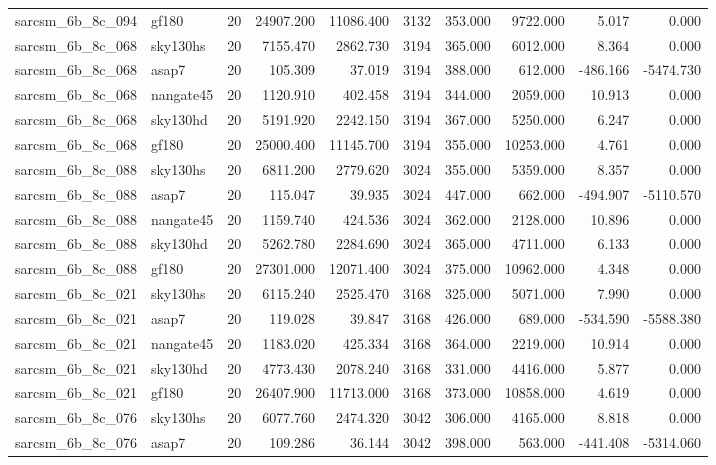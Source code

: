 \documentclass{article}
\begin{document}
\begin{longtable}{llrrrrrrrr}
sarcsm\_6b\_8c\_094 & gf180 & 20 & 24907.200 & 11086.400 & 3132 & 353.000 & 9722.000 & 5.017 & 0.000 \\
sarcsm\_6b\_8c\_068 & sky130hs & 20 & 7155.470 & 2862.730 & 3194 & 365.000 & 6012.000 & 8.364 & 0.000 \\
sarcsm\_6b\_8c\_068 & asap7 & 20 & 105.309 & 37.019 & 3194 & 388.000 & 612.000 & -486.166 & -5474.730 \\
sarcsm\_6b\_8c\_068 & nangate45 & 20 & 1120.910 & 402.458 & 3194 & 344.000 & 2059.000 & 10.913 & 0.000 \\
sarcsm\_6b\_8c\_068 & sky130hd & 20 & 5191.920 & 2242.150 & 3194 & 367.000 & 5250.000 & 6.247 & 0.000 \\
sarcsm\_6b\_8c\_068 & gf180 & 20 & 25000.400 & 11145.700 & 3194 & 355.000 & 10253.000 & 4.761 & 0.000 \\
sarcsm\_6b\_8c\_088 & sky130hs & 20 & 6811.200 & 2779.620 & 3024 & 355.000 & 5359.000 & 8.357 & 0.000 \\
sarcsm\_6b\_8c\_088 & asap7 & 20 & 115.047 & 39.935 & 3024 & 447.000 & 662.000 & -494.907 & -5110.570 \\
sarcsm\_6b\_8c\_088 & nangate45 & 20 & 1159.740 & 424.536 & 3024 & 362.000 & 2128.000 & 10.896 & 0.000 \\
sarcsm\_6b\_8c\_088 & sky130hd & 20 & 5262.780 & 2284.690 & 3024 & 365.000 & 4711.000 & 6.133 & 0.000 \\
sarcsm\_6b\_8c\_088 & gf180 & 20 & 27301.000 & 12071.400 & 3024 & 375.000 & 10962.000 & 4.348 & 0.000 \\
sarcsm\_6b\_8c\_021 & sky130hs & 20 & 6115.240 & 2525.470 & 3168 & 325.000 & 5071.000 & 7.990 & 0.000 \\
sarcsm\_6b\_8c\_021 & asap7 & 20 & 119.028 & 39.847 & 3168 & 426.000 & 689.000 & -534.590 & -5588.380 \\
sarcsm\_6b\_8c\_021 & nangate45 & 20 & 1183.020 & 425.334 & 3168 & 364.000 & 2219.000 & 10.914 & 0.000 \\
sarcsm\_6b\_8c\_021 & sky130hd & 20 & 4773.430 & 2078.240 & 3168 & 331.000 & 4416.000 & 5.877 & 0.000 \\
sarcsm\_6b\_8c\_021 & gf180 & 20 & 26407.900 & 11713.000 & 3168 & 373.000 & 10858.000 & 4.619 & 0.000 \\
sarcsm\_6b\_8c\_076 & sky130hs & 20 & 6077.760 & 2474.320 & 3042 & 306.000 & 4165.000 & 8.818 & 0.000 \\
sarcsm\_6b\_8c\_076 & asap7 & 20 & 109.286 & 36.144 & 3042 & 398.000 & 563.000 & -441.408 & -5314.060 \\

\end{longtable}
\end{document}
